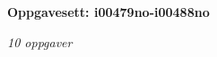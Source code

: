 \centerline{\bf Oppgavesett: i00479no-i00488no}
\vskip 10pt
\centerline{\it 10 oppgaver}\vskip 10pt
\vskip 10pt
